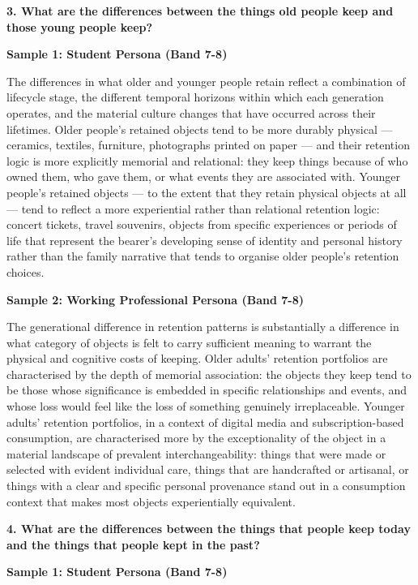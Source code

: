\separator

\begin{ieltsquestion}
\textbf{3. What are the differences between the things old people keep and those young people keep?}
\end{ieltsquestion}
\textbf{Sample 1: Student Persona (Band 7-8)}

The differences in what older and younger people retain reflect a combination of lifecycle stage, the different temporal horizons within which each generation operates, and the material culture changes that have occurred across their lifetimes. Older people's retained objects tend to be more durably physical — ceramics, textiles, furniture, photographs printed on paper — and their retention logic is more explicitly memorial and relational: they keep things because of who owned them, who gave them, or what events they are associated with. Younger people's retained objects — to the extent that they retain physical objects at all — tend to reflect a more experiential rather than relational retention logic: concert tickets, travel souvenirs, objects from specific experiences or periods of life that represent the bearer's developing sense of identity and personal history rather than the family narrative that tends to organise older people's retention choices.

\textbf{Sample 2: Working Professional Persona (Band 7-8)}

The generational difference in retention patterns is substantially a difference in what category of objects is felt to carry sufficient meaning to warrant the physical and cognitive costs of keeping. Older adults' retention portfolios are characterised by the depth of memorial association: the objects they keep tend to be those whose significance is embedded in specific relationships and events, and whose loss would feel like the loss of something genuinely irreplaceable. Younger adults' retention portfolios, in a context of digital media and subscription-based consumption, are characterised more by the exceptionality of the object in a material landscape of prevalent interchangeability: things that were made or selected with evident individual care, things that are handcrafted or artisanal, or things with a clear and specific personal provenance stand out in a consumption context that makes most objects experientially equivalent.

\separator

\begin{ieltsquestion}
\textbf{4. What are the differences between the things that people keep today and the things that people kept in the past?}
\end{ieltsquestion}
\textbf{Sample 1: Student Persona (Band 7-8)}

